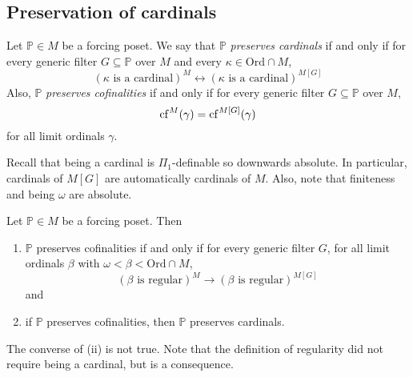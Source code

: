 \subsection{Preservation of cardinals}
\begin{definition}
    Let \( \mathbb P \in M \) be a forcing poset.
    We say that \( \mathbb P \) \emph{preserves cardinals} if and only if for every generic filter \( G \subseteq \mathbb P \) over \( M \) and every \( \kappa \in \mathrm{Ord} \cap M \),
    \[ (\kappa \text{ is a cardinal})^M \leftrightarrow (\kappa \text{ is a cardinal})^{M[G]} \]
    Also, \( \mathbb P \) \emph{preserves cofinalities} if and only if for every generic filter \( G \subseteq \mathbb P \) over \( M \),
    \[ \operatorname{cf}^M(\gamma) = \operatorname{cf}^{M[G]}(\gamma) \]
    for all limit ordinals \( \gamma \).
\end{definition}
Recall that being a cardinal is \( \Pi_1 \)-definable so downwards absolute.
In particular, cardinals of \( M[G] \) are automatically cardinals of \( M \).
Also, note that finiteness and being \( \omega \) are absolute.
\begin{lemma}
    Let \( \mathbb P \in M \) be a forcing poset.
    Then
    \begin{enumerate}
        \item \( \mathbb P \) preserves cofinalities if and only if for every generic filter \( G \), for all limit ordinals \( \beta \) with \( \omega < \beta < \mathrm{Ord} \cap M \),
        \[ (\beta \text{ is regular})^M \to (\beta \text{ is regular})^{M[G]} \]
        and
        \item if \( \mathbb P \) preserves cofinalities, then \( \mathbb P \) preserves cardinals.
    \end{enumerate}
\end{lemma}
The converse of (ii) is not true.
Note that the definition of regularity did not require being a cardinal, but is a consequence.
